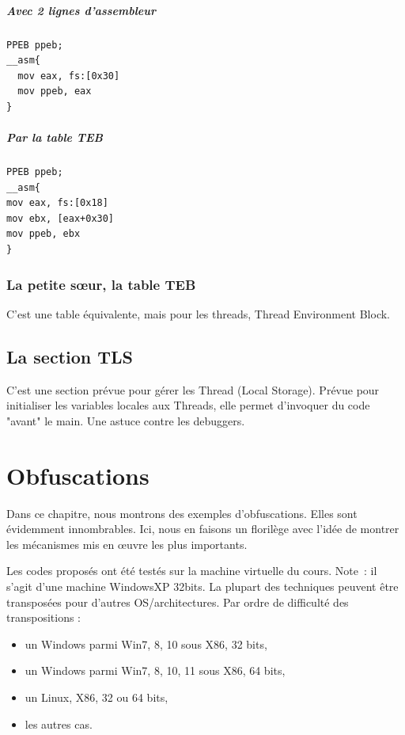\documentclass{book}
\begin{document}
\paragraph{Avec 2 lignes d'assembleur}

\begin{verbatim}
PPEB ppeb;
__asm{
  mov eax, fs:[0x30]
  mov ppeb, eax
}
\end{verbatim}

\paragraph{Par la table TEB}

\begin{verbatim}
PPEB ppeb;
__asm{
mov eax, fs:[0x18]
mov ebx, [eax+0x30]
mov ppeb, ebx
}
\end{verbatim}

\subsection{La petite s\oe ur, la table TEB}

C'est une table équivalente, mais pour les threads, Thread Environment Block. 

\section{La section TLS}

C'est une section prévue pour gérer les Thread (Local Storage). Prévue pour initialiser les variables locales aux Threads, elle permet d'invoquer du code "avant" le main. Une astuce contre les debuggers. 



\chapter{Obfuscations}

Dans ce chapitre, nous montrons des exemples d'obfuscations. Elles sont évidemment innombrables. Ici, nous en faisons un florilège avec l'idée de montrer les mécanismes mis en \oe uvre les plus importants. 

Les codes proposés ont été testés sur la machine virtuelle du cours. Note~: il s'agit d'une machine WindowsXP 32bits. La plupart des techniques peuvent être transposées pour d'autres OS/architectures. Par ordre de difficulté des transpositions : 
\begin{itemize}
	\item un Windows parmi Win7, 8, 10 sous X86, 32 bits,
	\item un Windows parmi Win7, 8, 10, 11 sous X86, 64 bits,
	\item un Linux, X86, 32 ou 64 bits,
	\item les autres cas. 
\end{itemize}
\end{document}
